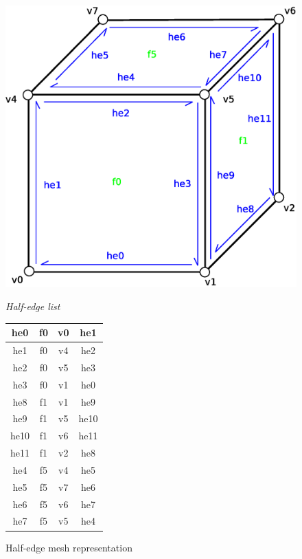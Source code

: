 \begin{figure}[h]

\begin{minipage}[hb]{0.65\linewidth}
\centering
\includegraphics[width=0.6\linewidth]{../img/he_rep_mesh.eps}
\label{fig:figure1}
\end{minipage}
\hspace{0.5cm}
\begin{minipage}[hb]{0.25\linewidth}
\centering
\emph{Half-edge list}
\vspace{1mm}

\begin{tabular}{|c|c|c|c|}
\hline
\textsf{he0} & \textsf{f0} & \textsf{v0} & \textsf{he1}\\
\hline
\textsf{he1} & \textsf{f0} & \textsf{v4} & \textsf{he2}\\
\hline
\textsf{he2} & \textsf{f0} & \textsf{v5} & \textsf{he3}\\
\hline
\textsf{he3} & \textsf{f0} & \textsf{v1} & \textsf{he0}\\
\hline

\hline
\textsf{he8} & \textsf{f1} & \textsf{v1} & \textsf{he9}\\
\hline
\textsf{he9} & \textsf{f1} & \textsf{v5} & \textsf{he10}\\
\hline
\textsf{he10} & \textsf{f1} & \textsf{v6} & \textsf{he11}\\
\hline
\textsf{he11} & \textsf{f1} & \textsf{v2} & \textsf{he8}\\
\hline

\hline
\textsf{he4} & \textsf{f5} & \textsf{v4} & \textsf{he5}\\
\hline
\textsf{he5} & \textsf{f5} & \textsf{v7} & \textsf{he6}\\
\hline
\textsf{he6} & \textsf{f5} & \textsf{v6} & \textsf{he7}\\
\hline
\textsf{he7} & \textsf{f5} & \textsf{v5} & \textsf{he4}\\
\hline
\end{tabular}
\label{fig:he_mesh}
\end{minipage}

\caption{Half-edge mesh representation}

\end{figure}

